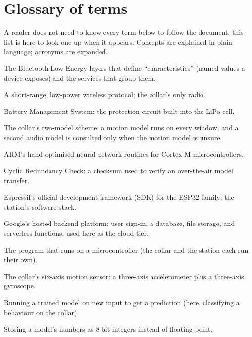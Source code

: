 {}
\label{sec:glossary}
\section*{Glossary of terms}

A reader does not need to know every term below to follow the document; this list is here to look one
up when it appears. Concepts are explained in plain language; acronyms are expanded.

\begin{description}[leftmargin=2.2em,style=nextline,font=\normalfont\bfseries]
  \item[ATT / GATT] The Bluetooth Low Energy layers that define ``characteristics'' (named values a
        device exposes) and the services that group them.
  \item[BLE (Bluetooth Low Energy)] A short-range, low-power wireless protocol; the collar's only
        radio.
  \item[BMS] Battery Management System: the protection circuit built into the LiPo cell.
  \item[Confidence-gated cascade] The collar's two-model scheme: a motion model runs on every window,
        and a second audio model is consulted only when the motion model is unsure.
  \item[CMSIS-NN] ARM's hand-optimised neural-network routines for Cortex-M microcontrollers.
  \item[CRC] Cyclic Redundancy Check: a checksum used to verify an over-the-air model transfer.
  \item[ESP-IDF] Espressif's official development framework (SDK) for the ESP32 family; the station's
        software stack.
  \item[Firebase] Google's hosted backend platform: user sign-in, a database, file storage, and
        serverless functions, used here as the cloud tier.
  \item[Firmware] The program that runs on a microcontroller (the collar and the station each run
        their own).
  \item[IMU (Inertial Measurement Unit)] The collar's six-axis motion sensor: a three-axis
        accelerometer plus a three-axis gyroscope.
  \item[Inference] Running a trained model on new input to get a prediction (here, classifying a
        behaviour on the collar).
  \item[int8 quantisation] Storing a model's numbers as 8-bit integers instead of floating point,

\end{description}
